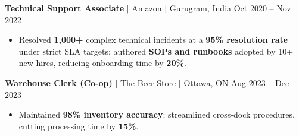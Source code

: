 \documentclass[11pt,a4paper]{article}
\begin{document}
\textbf{Technical Support Associate} $|$ Amazon $|$ Gurugram, India \hfill Oct 2020 -- Nov 2022
\begin{itemize}
    \item Resolved \textbf{1,000+} complex technical incidents at a \textbf{95\% resolution rate} under strict SLA targets; authored \textbf{SOPs and runbooks} adopted by 10+ new hires, reducing onboarding time by \textbf{20\%}.
\end{itemize}

\vspace{4pt}

\textbf{Warehouse Clerk (Co-op)} $|$ The Beer Store $|$ Ottawa, ON \hfill Aug 2023 -- Dec 2023
\begin{itemize}
    \item Maintained \textbf{98\% inventory accuracy}; streamlined cross-dock procedures, cutting processing time by \textbf{15\%}.
\end{itemize}
\end{document}
